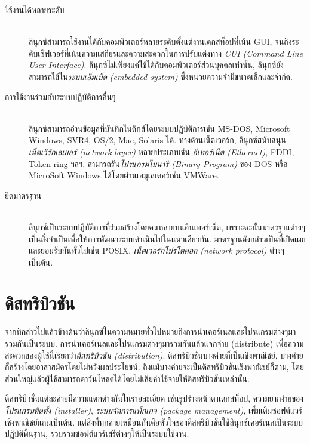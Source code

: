 \begin{thwbr}
{\begin{description}
\item[ใช้งานได้หลายระดับ]\mbox{}\\
ลินุกซ์สามารถใช้งานได้กับคอมพิวเตอร์หลายระดับตั้งแต่งานเดกสท็อปที่เน้น GUI, จนถึงระดับเซิฟเวอร์ที่เน้นความเสถียรและความสะดวกในการปรับแต่งทาง {\em CUI (Command Line User Interface)}.
ลินุกซ์ไม่เพียงแค่ใช้ได้กับคอมพิวเตอร์ส่วนบุคคลเท่านั้น, ลินุกซ์ยังสามารถใช้ใน{\em ระบบเอ็มเบ็ด (embedded system)} ซึ่งหน่วยความจำมีขนาดเล็กและจำกัด. 

\item[การใช้งานร่วมกับระบบปฏิบัติการอื่นๆ]\mbox{}\\
ลินุกซ์สามารถอ่านข้อมูลที่บันทึกในดิกส์โดยระบบปฏิบัติการเช่น  MS-DOS, Microsoft Windows, SVR4, OS/2, Mac, Solaris ได้. ทางด้านเน็ตเวอร์ก, ลินุกซ์สนับสนุน{\em เน็ตเวิร์กเลเยอร์ (network layer) }หลายประเภทเช่น {\em อีเทอร์เน็ต (Ethernet)},  FDDI, Token ring ฯลฯ. สามารถรัน{\em โปรแกรมไบนารี (Binary Program)} ของ DOS หรือ  MicroSoft Windows ได้โดยผ่านเอมูเลเตอร์เช่น  VMWare.

\item[ยึดมาตรฐาน]\mbox{}\\
ลินุกซ์เป็นระบบปฏิบัติการที่ร่วมสร้างโดยคนหลายบนอินเทอร์เน็ต, เพราะฉะนั้นมาตรฐานต่างๆเป็นสิ่งจำเป็นเพื่อให้การพัฒนาระบบดำเนินไปในแนวเดียวกัน. มาตรฐานดังกล่าวเป็นที่เปิดเผยและยอมรับกันทั่วไปเช่น  POSIX, {\em เน็ตเวอร์กโปรโตคอล (network protocol)}%
 ต่างๆเป็นต้น.
\end{description}


\section{ดิสทริบิวชัน}

จากที่กล่าวไปแล้วข้างต้นว่าลินุกซ์ในความหมายทั่วไปหมายถึงการนำเคอร์เนลและโปรแกรมต่างๆมารวมกันเป็นระบบ. การนำเคอร์เนลและโปรแกรมต่างๆมารวมกันแล้วแจกจ่าย (distribute) เพื่อความสะดวกของผู้ใช้นี้เรียกว่า{\em ดิสทริบิวชัน (distribution)}. ดิสทริบิวชันบางค่ายก็เป็นเชิงพาณิชย์, บางค่ายก็สร้างโดยอาสาสมัครโดยไม่หวังผลประโยชน์. ถึงแม้บางค่ายจะเป็นดิสทริบิวชันเชิงพาณิชย์ก็ตาม, โดยส่วนใหญ่แล้วผู้ใช้สามารถดาว์นโหลดได้โดยไม่เสียค่าใช้จ่ายให้ดิสทริบิวชันเหล่านั้น. 

ดิสทริบิวชั่นแต่ละค่ายมีความแตกต่างกันในรายละเอียด เช่นรูปร่างหน้าตาเดกสท็อป, ความยากง่ายของ{\em โปรแกรมติดตั้ง (installer)}, {\em ระบบจัดการแพ็กเกจ (package management)}, เพิ่มเติมซอฟต์แวร์เชิงพาณิชย์แถมเป็นต้น. แต่สิ่งที่ทุกค่ายเหมือนกันคือหัวใจของดิสทริบิวชันใช้ลินุกซ์เคอร์เนลเป็นระบบปฏิบัติพื้นฐาน, รวบรวมซอฟต์แวร์เสรีต่างๆให้เป็นระบบใช้งาน. 

}
\end{thwbr}
